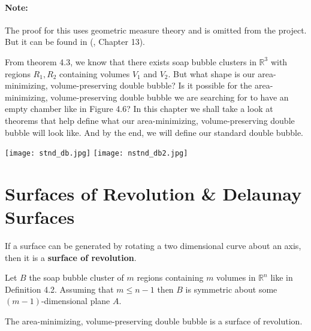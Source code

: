 \documentclass[a4paper,12pt]{report}
\begin{document}
\paragraph{Note:} The proof for this uses geometric measure theory and is omitted from the project. But it can be found in (\cite{morgan}, Chapter 13). \newline

From theorem 4.3, we know that there exists soap bubble clusters in $\mathbb{R}^{3}$ with regions $R_{1}, R_{2}$ containing volumes $V_{1}$ and $V_{2}$. But what shape is our area-minimizing, volume-preserving double bubble? Is it possible for the area-minimizing, volume-preserving double bubble we are searching for to have an empty chamber like in Figure 4.6? In this chapter we shall take a look at theorems that help define what our area-minimizing, volume-preserving double bubble will look like. And by the end, we will define our standard double bubble.

\begin{center}
\texttt{[image: stnd\_db.jpg]}
\hspace{4cm}
\texttt{[image: nstnd\_db2.jpg]}
\vspace{-1cm}
\begin{multicols}{2}
\vspace{5cm}
\end{multicols}
\end{center}

\section{Surfaces of Revolution \& Delaunay Surfaces}

\begin{definition}
If a surface can be generated by rotating a two dimensional curve about an axis, then it is a \textbf{surface of revolution}.
\end{definition}

\begin{theorem}
Let $B$ the soap bubble cluster of $m$ regions containing $m$ volumes in $\mathbb{R}^{n}$ like in Definition 4.2. Assuming that $m \leq n - 1$ then $B$ is symmetric about some $(m-1)$-dimensional plane $A$.
\end{theorem}

\begin{corollary}
The area-minimizing, volume-preserving double bubble is a surface of revolution.
\end{corollary}
\end{document}
